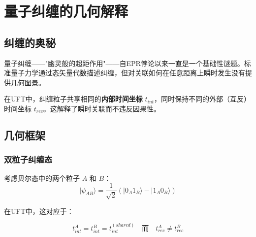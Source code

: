 \section{量子纠缠的几何解释}
\label{sec:entanglement_geometry}

\subsection{纠缠的奥秘}

量子纠缠——"幽灵般的超距作用"——自EPR悖论以来一直是一个基础性谜题。标准量子力学通过态矢量代数描述纠缠，但对关联如何在任意距离上瞬时发生没有提供几何图景。

\begin{insight}[纠缠作为共享内时间]
在UFT中，纠缠粒子共享相同的\textbf{内部时间坐标} $t_{int}$，同时保持不同的外部（互反）时间坐标 $t_{rec}$。这解释了瞬时关联而不违反因果性。
\end{insight}

\subsection{几何框架}

\subsubsection{双粒子纠缠态}

考虑贝尔态中的两个粒子 $A$ 和 $B$：
\begin{equation}
    |\psi_{AB}\rangle = \frac{1}{\sqrt{2}}(|0_A 1_B\rangle - |1_A 0_B\rangle)
\end{equation}

在UFT中，这对应于：

\begin{equation}
    t_{int}^A = t_{int}^B = t_{int}^{(shared)}
    \quad \text{而} \quad
    t_{rec}^A \neq t_{rec}^B
\end{equation}

